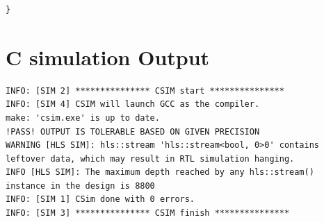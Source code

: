 \documentclass{article}
\begin{document}
\begin{lstlisting}
}

\end{lstlisting}
\vspace{3cm}


\section{C simulation Output}
\begin{lstlisting}
INFO: [SIM 2] *************** CSIM start ***************
INFO: [SIM 4] CSIM will launch GCC as the compiler.
make: 'csim.exe' is up to date.
!PASS! OUTPUT IS TOLERABLE BASED ON GIVEN PRECISION
WARNING [HLS SIM]: hls::stream 'hls::stream<bool, 0>0' contains 
leftover data, which may result in RTL simulation hanging.
INFO [HLS SIM]: The maximum depth reached by any hls::stream() 
instance in the design is 8800
INFO: [SIM 1] CSim done with 0 errors.
INFO: [SIM 3] *************** CSIM finish ***************




\end{lstlisting}
\vspace{10cm}
\end{document}
